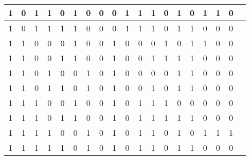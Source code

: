 \begin{tabular}{ccccc||ccc|ccc|ccc|ccc|cc}
\hline
1&0&1&1&0&1&0&0&0&1&1&1&0&1&0&1&1&0&\\
\hline
1&0&1&1&1&1&0&0&0&1&1&1&0&1&1&0&0&0&\\
\hline
1&1&0&0&0&1&0&0&1&0&0&0&1&0&1&1&0&0&\\
\hline
1&1&0&0&1&1&0&0&1&0&0&1&1&1&1&0&0&0&\\
\hline
1&1&0&1&0&0&1&0&1&0&0&0&0&1&1&0&0&0&\\
\hline
1&1&0&1&1&0&1&0&1&0&0&1&0&1&1&0&0&0&\\
\hline
1&1&1&0&0&1&0&0&1&0&1&1&1&0&0&0&0&0&\\
\hline
1&1&1&0&1&1&0&0&1&0&1&1&1&1&1&0&0&0&\\
\hline
1&1&1&1&0&0&1&0&1&0&1&1&0&1&0&1&1&1&\\
\hline
1&1&1&1&1&0&1&0&1&0&1&1&0&1&1&0&0&0&\\
\hline
\end{tabular}

\pagebreak

